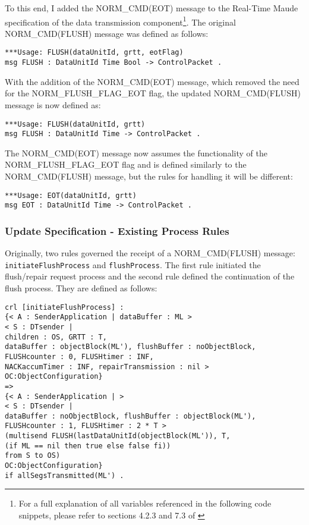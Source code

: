 \documentclass[10pt, journal]{IEEEtran}
\begin{document}
To this end, I added the NORM\_CMD(EOT) message to the Real-Time Maude specification of the data transmission component\footnote{For a full explanation of all variables referenced in the following code snippets, please refer to sections 4.2.3 and 7.3 of \cite{Lien2004}}. The original NORM\_CMD(FLUSH) message was defined as follows:
\begin{lstlisting}[caption=Original FLUSH Message Definition, label=lst1:mxm,]
***Usage: FLUSH(dataUnitId, grtt, eotFlag)
msg FLUSH : DataUnitId Time Bool -> ControlPacket .
\end{lstlisting}

With the addition of the NORM\_CMD(EOT) message, which removed the need for the NORM\_FLUSH\_FLAG\_EOT flag, the updated NORM\_CMD(FLUSH) message is now defined as:
\begin{lstlisting}[caption=New FLUSH Message Definition, label=lst2:mxm,]
***Usage: FLUSH(dataUnitId, grtt)
msg FLUSH : DataUnitId Time -> ControlPacket .
\end{lstlisting}

The NORM\_CMD(EOT) message now assumes the functionality of the NORM\_FLUSH\_FLAG\_EOT flag and is defined similarly to the NORM\_CMD(FLUSH) message, but the rules for handling it will be different:
\begin{lstlisting}[caption=EOT Message Definition, label=lst3:mxm,]
***Usage: EOT(dataUnitId, grtt)
msg EOT : DataUnitId Time -> ControlPacket .
\end{lstlisting}

\bigbreak
\subsubsection{Update Specification - Existing Process Rules}
Originally, two rules governed the receipt of a NORM\_CMD(FLUSH) message: \texttt{initiateFlushProcess} and \texttt{flushProcess}. The first rule initiated the flush/repair request process and the second rule defined the continuation of the flush process. They are defined as follows:

\begin{lstlisting}[caption=Rule to Initiate NORM FLUSH Process, label=lst4:mxm,]
crl [initiateFlushProcess] :
{< A : SenderApplication | dataBuffer : ML > 
< S : DTsender |
children : OS, GRTT : T,
dataBuffer : objectBlock(ML'), flushBuffer : noObjectBlock,
FLUSHcounter : 0, FLUSHtimer : INF,  
NACKaccumTimer : INF, repairTransmission : nil >
OC:ObjectConfiguration}
=>
{< A : SenderApplication | >
< S : DTsender |
dataBuffer : noObjectBlock, flushBuffer : objectBlock(ML'),
FLUSHcounter : 1, FLUSHtimer : 2 * T >
(multisend FLUSH(lastDataUnitId(objectBlock(ML')), T,
(if ML == nil then true else false fi)) 
from S to OS)
OC:ObjectConfiguration}
if allSegsTransmitted(ML') .
\end{lstlisting}
\end{document}
